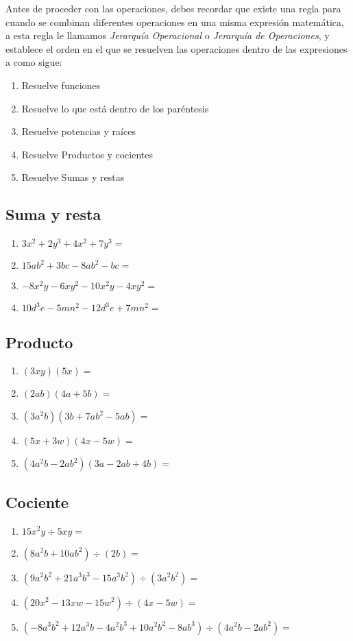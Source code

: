 \documentclass[11pt,twocolumn]{article} %
\begin{document}
Antes de proceder con las operaciones, debes recordar que existe una regla para cuando se combinan diferentes operaciones en una misma expresión matemática, a esta regla le llamamos \emph{Jerarquía Operacional} o \emph{Jerarquía de Operaciones}, y establece el orden en el que se resuelven las operaciones dentro de las expresiones a como sigue:
\begin{enumerate}
\item Resuelve funciones
\item Resuelve lo que está dentro de los paréntesis
\item Resuelve potencias y raíces
\item Resuelve Productos y cocientes
\item Resuelve Sumas y restas
\end{enumerate}
\subsection{Suma y resta}
\begin{enumerate}
\item $3x^2 + 2y^3 + 4x^2 + 7y^3 =$
\item $15ab^2 + 3bc - 8ab^2 -bc=$
\item $-8x^2y - 6xy^2 - 10x^2y - 4xy^2 =$
\item $ 10d^3e - 5mn^2 - 12d^3e + 7mn^2 =$
\end{enumerate}
\subsection{Producto}
\begin{enumerate}
\item $(3xy)(5x) =$
\item $(2ab)(4a + 5b)=$
\item $(3a^2b)(3b + 7ab^2 - 5ab) =$
\item $(5x + 3w)(4x - 5w) =$
\item $(4a^2b - 2ab^2)(3a -2ab +4b)=$
\end{enumerate}
\subsection{Cociente}
\begin{enumerate}
\item $15x^2y \div 5xy=$
\item $(8a^2b+10ab^2)\div(2b)=$
\item $(9a^2b^2+21a^3b^3-15a^3b^2)\div(3a^2b^2)=$
\item $(20x^2-13xw-15w^2)\div(4x-5w)=$
\item $(-8a^3b^2+12a^3b-4a^2b^3+10a^2b^2-8ab^3)\div(4a^2b-2ab^2)=$
\end{enumerate}
\end{document}
